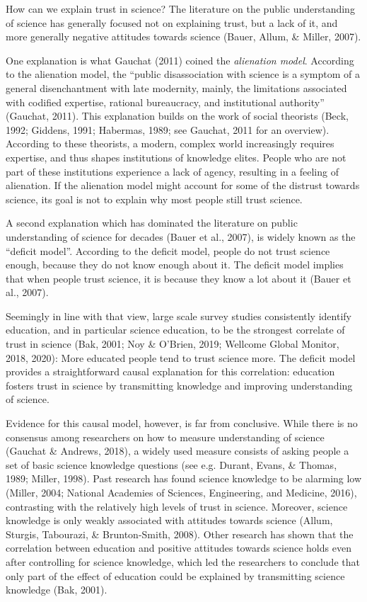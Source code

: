 \documentclass[
  doc,floatsintext]{apa6}
\begin{document}
How can we explain trust in science? The literature on the public understanding of science has generally focused not on explaining trust, but a lack of it, and more generally negative attitudes towards science (Bauer, Allum, \& Miller, 2007).

One explanation is what Gauchat (2011) coined the \emph{alienation model}. According to the alienation model, the ``public disassociation with science is a symptom of a general disenchantment with late modernity, mainly, the limitations associated with codified expertise, rational bureaucracy, and institutional authority'' (Gauchat, 2011). This explanation builds on the work of social theorists (Beck, 1992; Giddens, 1991; Habermas, 1989; see Gauchat, 2011 for an overview). According to these theorists, a modern, complex world increasingly requires expertise, and thus shapes institutions of knowledge elites. People who are not part of these institutions experience a lack of agency, resulting in a feeling of alienation. If the alienation model might account for some of the distrust towards science, its goal is not to explain why most people still trust science.

A second explanation which has dominated the literature on public understanding of science for decades (Bauer et al., 2007), is widely known as the ``deficit model''. According to the deficit model, people do not trust science enough, because they do not know enough about it. The deficit model implies that when people trust science, it is because they know a lot about it (Bauer et al., 2007).

Seemingly in line with that view, large scale survey studies consistently identify education, and in particular science education, to be the strongest correlate of trust in science (Bak, 2001; Noy \& O'Brien, 2019; Wellcome Global Monitor, 2018, 2020): More educated people tend to trust science more. The deficit model provides a straightforward causal explanation for this correlation: education fosters trust in science by transmitting knowledge and improving understanding of science.

Evidence for this causal model, however, is far from conclusive. While there is no consensus among researchers on how to measure understanding of science (Gauchat \& Andrews, 2018), a widely used measure consists of asking people a set of basic science knowledge questions (see e.g. Durant, Evans, \& Thomas, 1989; Miller, 1998). Past research has found science knowledge to be alarming low (Miller, 2004; National Academies of Sciences, Engineering, and Medicine, 2016), contrasting with the relatively high levels of trust in science. Moreover, science knowledge is only weakly associated with attitudes towards science (Allum, Sturgis, Tabourazi, \& Brunton-Smith, 2008). Other research has shown that the correlation between education and positive attitudes towards science holds even after controlling for science knowledge, which led the researchers to conclude that only part of the effect of education could be explained by transmitting science knowledge (Bak, 2001).
\end{document}
